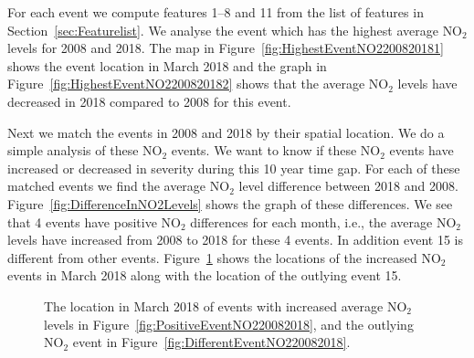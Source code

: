 \documentclass[a4paper,11pt]{article}
\begin{document}
For each event we compute features 1--8 and 11 from the list of features in Section~\ref{sec:Featurelist}. We analyse the event which has the highest average $\text{NO}_2$ levels for 2008 and 2018. The map in Figure~\ref{fig:HighestEventNO2200820181} shows the event location in March 2018 and the graph in Figure~\ref{fig:HighestEventNO2200820182} shows that the average $\text{NO}_2$ levels have decreased in 2018 compared to 2008 for this event.

Next we match the events in 2008 and 2018 by their spatial location. We do a simple analysis of these $\text{NO}_2$ events. We want to know if these $\text{NO}_2$ events have increased or decreased in severity during this 10 year time gap. For each of these matched events we find the average $\text{NO}_2$ level difference between 2018 and 2008. Figure~\ref{fig:DifferenceInNO2Levels} shows the graph of these differences. We see that 4 events have positive $\text{NO}_2$ differences for each month, i.e., the average $\text{NO}_2$ levels have increased from 2008 to 2018 for these 4 events. In addition event 15 is different from other events. Figure~\ref{fig:PositiveDifferentEventsNO220082018} shows the locations of the increased $\text{NO}_2$ events in March 2018 along with the location of the outlying event 15.

\begin{figure}
	\centering
	\caption{The location in March 2018 of events with increased average $\text{NO}_2$ levels in Figure~\ref{fig:PositiveEventNO220082018}, and the outlying $\text{NO}_2$ event in Figure~\ref{fig:DifferentEventNO220082018}.}
	\label{fig:PositiveDifferentEventsNO220082018}
\end{figure}
\end{document}
